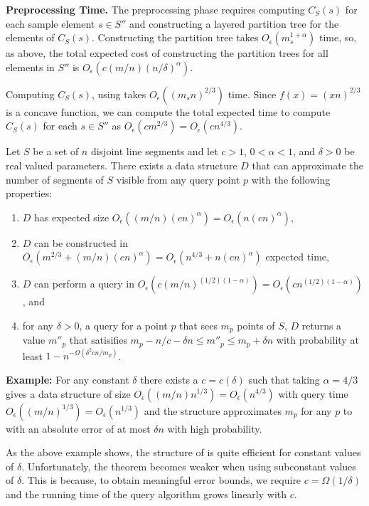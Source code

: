\documentclass{patmorin}
\newcommand{\Oe}{O_\epsilon}
\begin{document}
\noindent\textbf{Preprocessing Time.} 
The preprocessing phase requires computing $C_S(s)$ for each sample element
$s\in S''$ and constructing a layered partition tree for the elements of
$C_S(s)$.  Constructing the partition tree takes $\Oe(m_s^{1+\alpha})$
time, so, as above, the total expected cost of constructing the partition
trees for all elements in $S''$ is $\Oe(c(m/n)(n/\delta)^\alpha)$.

Computing $C_S(s)$, using  takes $\Oe((m_sn)^{2/3})$
time. Since $f(x) = (xn)^{2/3}$ is a concave function, we can compute the
total expected time to compute $C_S(s)$ for each $s\in S''$ as
$\Oe(cm^{2/3})=\Oe(cn^{4/3})$.

\begin{thm}
  Let $S$ be a set of $n$ disjoint line segments and let $c>1$, $0 <
  \alpha < 1$, and $\delta > 0$ be real valued parameters.  There exists
  a data structure $D$ that can approximate the number of segments of $S$
  visible from any query point $p$ with the following properties:
  \begin{enumerate}
    \item $D$ has expected size $\Oe((m/n)(cn)^{\alpha}) =
          \Oe(n(cn)^\alpha)$,
    \item $D$ can be constructed in 
          $\Oe(m^{2/3} + (m/n)(cn)^{\alpha}) = \Oe(n^{4/3} + n(cn)^\alpha)$
          expected time,
    \item $D$ can perform a query in $\Oe(c(m/n)^{(1/2)(1-\alpha)}) =
          \Oe(cn^{(1/2)(1-\alpha)})$, and
    \item for any $\delta > 0$, a query for a point $p$ that sees $m_p$
          points of $S$, $D$ returns a value $m''_p$ that satisifies 
          $m_p - n/c - \delta n \le m''_p \le m_p + \delta n$ with 
          probability at least $1-n^{-\Omega(\delta^2 cn/m_p)}$.
  \end{enumerate}
\end{thm}

\noindent\textbf{Example:} For any constant $\delta$ there exists
a $c=c(\delta)$ such that taking $\alpha = 4/3$ gives a data
structure of size $\Oe((m/n)n^{1/3})=\Oe(n^{4/3})$ with query time
$\Oe((m/n)^{1/3})=\Oe(n^{1/3})$ and the structure approximates $m_p$
for any $p$ to with an absolute error of at most $\delta n$ with high
probability.

As the above example shows, the structure of  is quite
efficient for constant values of $\delta$. Unfortunately, the theorem
becomes weaker when using subconstant values of $\delta$.
This is because, to obtain meaningful error bounds, we require 
$c=\Omega(1/\delta)$ and the running time of the query algorithm grows
linearly with $c$.
\end{document}
